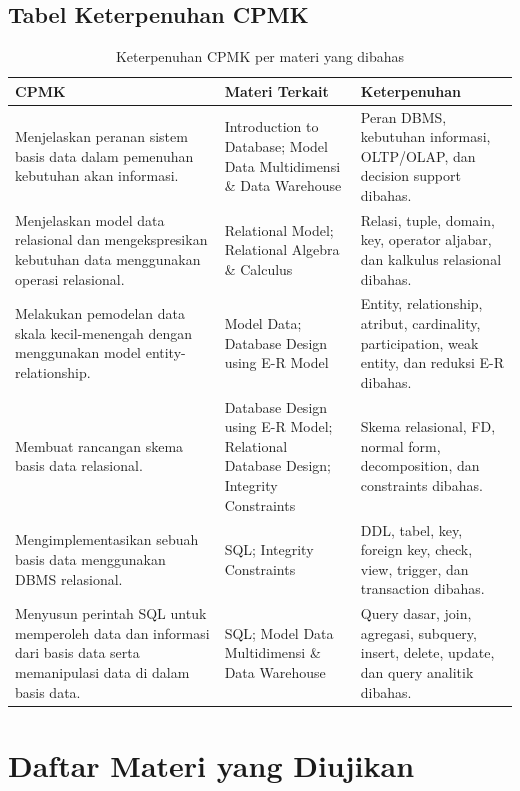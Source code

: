 \documentclass[11pt,a4paper]{article}
\begin{document}
\subsection{Tabel Keterpenuhan CPMK}

\begin{table}[H]
\centering
\small
\begin{tabularx}{\textwidth}{|L{0.46\textwidth}|L{0.30\textwidth}|X|}
\hline
\textbf{CPMK} & \textbf{Materi Terkait} & \textbf{Keterpenuhan} \\
\hline
Menjelaskan peranan sistem basis data dalam pemenuhan kebutuhan akan informasi. & Introduction to Database; Model Data Multidimensi \& Data Warehouse & Peran DBMS, kebutuhan informasi, OLTP/OLAP, dan decision support dibahas. \\
\hline
Menjelaskan model data relasional dan mengekspresikan kebutuhan data menggunakan operasi relasional. & Relational Model; Relational Algebra \& Calculus & Relasi, tuple, domain, key, operator aljabar, dan kalkulus relasional dibahas. \\
\hline
Melakukan pemodelan data skala kecil-menengah dengan menggunakan model entity-relationship. & Model Data; Database Design using E-R Model & Entity, relationship, atribut, cardinality, participation, weak entity, dan reduksi E-R dibahas. \\
\hline
Membuat rancangan skema basis data relasional. & Database Design using E-R Model; Relational Database Design; Integrity Constraints & Skema relasional, FD, normal form, decomposition, dan constraints dibahas. \\
\hline
Mengimplementasikan sebuah basis data menggunakan DBMS relasional. & SQL; Integrity Constraints & DDL, tabel, key, foreign key, check, view, trigger, dan transaction dibahas. \\
\hline
Menyusun perintah SQL untuk memperoleh data dan informasi dari basis data serta memanipulasi data di dalam basis data. & SQL; Model Data Multidimensi \& Data Warehouse & Query dasar, join, agregasi, subquery, insert, delete, update, dan query analitik dibahas. \\
\hline
\end{tabularx}
\caption{Keterpenuhan CPMK per materi yang dibahas}
\label{tab:keterpenuhan-cpmk}
\end{table}

\section{Daftar Materi yang Diujikan}
\end{document}
